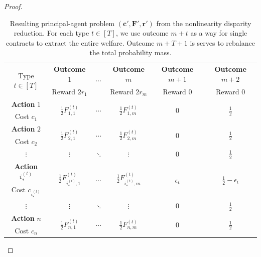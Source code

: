 \documentclass{article}
\newcommand{\cost}[1]{c_{#1}}
\newcommand{\costvector}{\bm{c}}
\newcommand{\TypedForecast}[3]{F^{(#1)}_{#2, #3}}
\newcommand{\ForecastTensor}{\bm{F}}
\newcommand{\reward}[1]{r_{#1}}
\newcommand{\rewardvector}{\bm{r}}
\newcommand{\PrincipalAgentProblemPrime}{\left(\costvector', \ForecastTensor', \rewardvector'\right)}
\newcommand{\OptimalAction}{i_*}
\newcommand{\TypedOptimalAction}[1]{\OptimalAction^{(#1)}}
\begin{document}
\begin{proof}
\begin{table}
\centering
\begin{tabular}{cccccc}
  \toprule
  \multirow{2}{*}{Type $t \in [T]$} & \textbf{Outcome} $1$  & \multirow{2}{*}{$\cdots$} & \textbf{Outcome} $m$  & \textbf{Outcome} $m+1$ & \textbf{Outcome} $m+2$ \\
                                    & Reward $2 \reward{1}$ &                           & Reward $2 \reward{m}$ & Reward $0$             & Reward $0$               \\ \midrule
  \textbf{Action} $1$ & \multirow{2}{*}{$\tfrac12 \TypedForecast{t}{1}{1}$} & \multirow{2}{*}{$\cdots$} & \multirow{2}{*}{$\tfrac12 \TypedForecast{t}{1}{m}$} & \multirow{2}{*}{$0$} & \multirow{2}{*}{$\tfrac12$} \\ Cost $\cost{1}$ \\
  \textbf{Action} $2$ & \multirow{2}{*}{$\tfrac12 \TypedForecast{t}{2}{1}$} & \multirow{2}{*}{$\cdots$} & \multirow{2}{*}{$\tfrac12 \TypedForecast{t}{2}{m}$} & \multirow{2}{*}{$0$} & \multirow{2}{*}{$\tfrac12$} \\ Cost $\cost{2}$ \\
  $\vdots$ & $\vdots$ & $\ddots$ & $\vdots$ & $0$ & $\tfrac12$ \\
  \textbf{Action} $\TypedOptimalAction{t}$ & \multirow{2}{*}{$\tfrac12 \TypedForecast{t}{\TypedOptimalAction{t}}{1}$} & \multirow{2}{*}{$\cdots$} & \multirow{2}{*}{$\tfrac12 \TypedForecast{t}{\TypedOptimalAction{t}}{m}$} & \multirow{2}{*}{$\epsilon_t$} & \multirow{2}{*}{$\frac12 - \epsilon_t$} \\ Cost $\cost{\TypedOptimalAction{t}}$ \\
  $\vdots$ & $\vdots$ & $\ddots$ & $\vdots$ & $0$ & $\tfrac12$ \\
  \textbf{Action} $n$ & \multirow{2}{*}{$\tfrac12 \TypedForecast{t}{n}{1}$} & \multirow{2}{*}{$\cdots$} & \multirow{2}{*}{$\tfrac12 \TypedForecast{t}{n}{m}$} & \multirow{2}{*}{$0$} & \multirow{2}{*}{$\tfrac12$} \\ Cost $\cost{n}$ \\
  \bottomrule
\end{tabular}
\caption{Resulting principal-agent problem $\PrincipalAgentProblemPrime$ from the nonlinearity disparity reduction. For each type $t \in [T]$, we use outcome $m + t$ as a way for single contracts to extract the entire welfare. Outcome $m + T + 1$ is serves to rebalance the total probability mass.}
\label{tab:nonlinearity-disparity}
\end{table}%
  

\end{proof}
\end{document}
